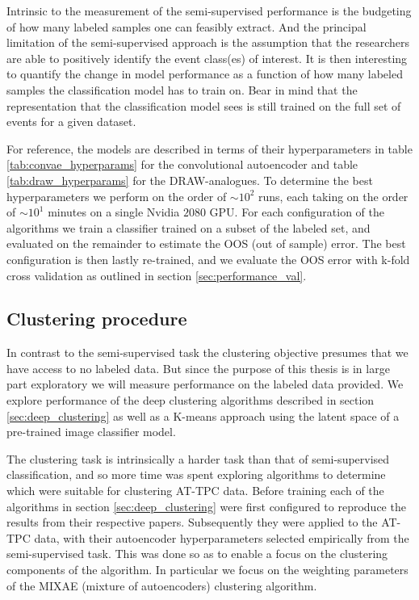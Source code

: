 Intrinsic to the measurement of the semi-supervised performance is the budgeting of how many labeled samples one can feasibly extract. And the principal limitation of the semi-supervised approach is the assumption that the researchers are able to positively identify the event class(es) of interest. It is then interesting to quantify the change in model performance as a function of how many labeled samples the classification model has to train on. Bear in mind that the representation that the classification model sees is still trained on the full set of events for a given dataset. 

For reference, the models are described in terms of their hyperparameters in table \ref{tab:convae_hyperparams} for the convolutional autoencoder and table \ref{tab:draw_hyperparams} for the DRAW-analogues. To determine the best hyperparameters we perform on the order of $\sim 10^2$ runs, each taking on the order of $\sim 10^1$ minutes on a single Nvidia $2080$ GPU. For each configuration of the algorithms we train a classifier trained on a subset of the labeled set, and evaluated on the remainder to estimate the OOS (out of sample) error. The best configuration is then lastly re-trained, and we evaluate the OOS error with k-fold cross validation as outlined in section \ref{sec:performance_val}.

\subsection{Clustering procedure}

In contrast to the semi-supervised task the clustering objective presumes that we have access to no labeled data. But since the purpose of this thesis is in large part exploratory we will measure performance on the labeled data provided. We explore performance of the deep clustering algorithms described in section \ref{sec:deep_clustering} as well as a K-means approach using the latent space of a pre-trained image classifier model. 

The clustering task is intrinsically a harder task than that of semi-supervised classification, and so more time was spent exploring algorithms to determine which were suitable for clustering AT-TPC data. Before training each of the algorithms in section \ref{sec:deep_clustering} were first configured to reproduce the results from their respective papers. Subsequently they were applied to the AT-TPC data, with their autoencoder hyperparameters selected empirically from the semi-supervised task. This was done so as to enable a focus on the clustering components of the algorithm. In particular we focus on the weighting parameters of the MIXAE (mixture of autoencoders) clustering algorithm.
